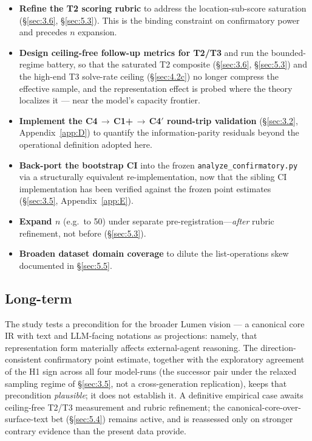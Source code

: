\documentclass[11pt]{article}
\begin{document}
\begin{itemize}
\item \textbf{Refine the T2 scoring rubric} to address the
  location-sub-score saturation (\S\ref{sec:3.6},
  \S\ref{sec:5.3}). This is the binding constraint on
  confirmatory power and precedes $n$ expansion.
\item \textbf{Design ceiling-free follow-up metrics for
  T2/T3} and run the bounded-regime battery, so that the
  saturated T2 composite (\S\ref{sec:3.6},
  \S\ref{sec:5.3}) and the high-end T3 solve-rate ceiling
  (\S\ref{sec:4.2c}) no longer compress the effective
  sample, and the representation effect is probed where the
  theory localizes it --- near the model's capacity frontier.
\item \textbf{Implement the C4\,$\to$\,C1+\,$\to$\,C4$'$
  round-trip validation} (\S\ref{sec:3.2},
  Appendix~\ref{app:D}) to quantify the information-parity
  residuals beyond the operational definition adopted here.
\item \textbf{Back-port the bootstrap CI} into the frozen
  \texttt{analyze\_confirmatory.py} via a structurally
  equivalent re-implementation, now that the sibling CI
  implementation has been verified against the frozen point
  estimates (\S\ref{sec:3.5}, Appendix~\ref{app:E}).
\item \textbf{Expand $n$} (e.g.\ to 50) under separate
  pre-registration---\emph{after} rubric refinement, not
  before (\S\ref{sec:5.3}).
\item \textbf{Broaden dataset domain coverage} to dilute the
  list-operations skew documented in \S\ref{sec:5.5}.
\end{itemize}

\subsection{Long-term}
\label{sec:6.3}
The study tests a precondition for the broader Lumen vision ---
a canonical core IR with text and LLM-facing notations as
projections: namely, that representation form materially affects
external-agent reasoning. The direction-consistent confirmatory
point estimate, together with the exploratory agreement of the
H1 sign across all four model-runs (the successor pair under
the relaxed sampling regime of \S\ref{sec:3.5}, not a
cross-generation replication), keeps that precondition
\emph{plausible}; it does not establish it. A definitive empirical case awaits ceiling-free T2/T3
measurement and rubric refinement; the canonical-core-over-surface-text bet
(\S\ref{sec:5.4}) remains active, and is reassessed only on
stronger contrary evidence than the present data provide.
\end{document}
